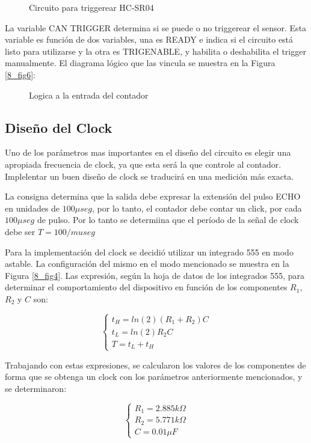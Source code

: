 \begin{figure}[H]
\centering

\caption{Circuito para triggerear HC-SR04}
\label{8_fig3}
\end{figure}

La variable CAN TRIGGER determina si se puede o no triggerear el sensor. Esta variable es función de dos variables, una es READY e indica si el circuito está listo para utilizarse y la otra es TRIGENABLE, y habilita o deshabilita el trigger manualmente. El diagrama lógico que las vincula se muestra en la Figura \ref{8_fig6}:

\begin{figure}[H]
\centering

\caption{Logica a la entrada del contador} \label{8_fig5}
\end{figure}


\subsection*{Diseño del Clock}
Uno de los parámetros mas importantes en el diseño del circuito es elegir una apropiada frecuencia de clock, ya que esta será la que controle al contador. Implelentar un buen diseño de clock se traducirá en una medición más exacta.

La consigna determina que la salida debe expresar la extensión del pulso ECHO en unidades de $100 \mu seg$, por lo tanto, el contador debe contar un click, por cada $100 \mu seg$ de pulso. Por lo tanto se determiina que el período de la señal de clock debe ser $T=100 /mu seg$


Para la implementación del clock se decidió utilizar un integrado 555 en modo astable. La configuración del mismo en el modo mencionado se muestra en la Figura \ref{8_fig4}. Las expresión, según la hoja de datos de los integrados 555, para determinar el comportamiento del dispositivo en función de los componentes $R_1$, $R_2$ y $C$ son:

\[
\begin{cases}
	t_H=ln(2)(R_1 + R_2)C\\
	t_L=ln(2)R_2C\\
	T=t_L + t_H	
\end{cases}
\]

Trabajando con estas expresiones, se calcularon los valores de los componentes de forma que se obtenga un clock con los parámetros anteriormente mencionados, y se determinaron:

\[
\begin{cases}
	R_1=2.885 k\Omega\\
	R_2=5.771 k\Omega\\
	C=0.01\mu F	
\end{cases}
\]

